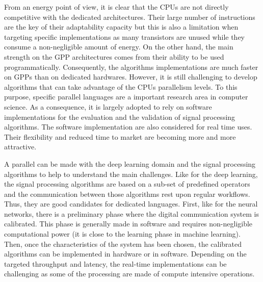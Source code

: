 From an energy point of view, it is clear that the CPUs are not directly
competitive with the dedicated architectures. Their large number of instructions
are the key of their adaptability capacity but this is also a limitation when
targeting specific implementations as many transistors are unused while they
consume a non-negligible amount of energy. On the other hand, the main strength
on the GPP architectures comes from their ability to be used programmatically.
Consequently, the algorithms implementations are much faster on GPPs than on
dedicated hardwares. However, it is still challenging to develop algorithms that
can take advantage of the CPUs parallelism levels. To this purpose, specific
parallel languages are a important research area in computer science. As a
consequence, it is largely adopted to rely on software implementations for
the evaluation and the validation of signal processing algorithms. The software
implementation are also considered for real time uses. Their flexibility and
reduced time to market are becoming more and more attractive.

A parallel can be made with the deep learning domain and the signal processing
algorithms to help to understand the main challenges. Like for the deep
learning, the signal processing algorithms are based on a sub-set of predefined
operators and the communication between those algorithms rest upon regular
workflows. Thus, they are good candidates for dedicated languages. First, like
for the neural networks, there is a preliminary phase where the digital
communication system is calibrated. This phase is generally made in software
and requires non-negligible computational power (it is close to the learning
phase in machine learning). Then, once the characteristics of the system has
been chosen, the calibrated algorithms can be implemented in hardware or in
software. Depending on the targeted throughput and latency, the real-time
implementations can be challenging as some of the processing are made of compute
intensive operations.